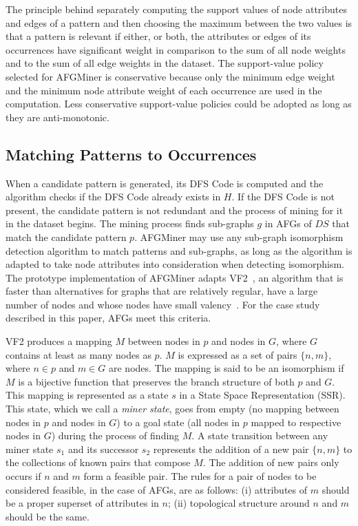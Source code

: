 The principle behind separately computing the support values of node attributes and edges of a pattern and then choosing the maximum between the two values is that a pattern is relevant if either, or both, the attributes or edges of its occurrences have significant weight in comparison to the sum of all node weights and to the sum of all edge weights in the dataset. The support-value policy selected for AFGMiner is conservative because only the minimum edge weight and the minimum node attribute weight of each occurrence are used in the computation. Less conservative support-value policies could be adopted as long as they are anti-monotonic.  

\subsection{Matching Patterns to Occurrences}
When a candidate pattern is generated, its DFS Code is computed and the algorithm checks if the DFS Code already exists in $H$. If the DFS Code is not present, the candidate pattern is not redundant and the process of mining for it in the dataset begins. The mining process finds sub-graphs $g$ in AFGs of $DS$ that match the candidate pattern $p$. AFGMiner may use any sub-graph isomorphism detection algorithm to match patterns and sub-graphs, as long as the algorithm is adapted to take node attributes into consideration when detecting isomorphism. The prototype implementation of AFGMiner adapts VF2~\cite{Cordella}, an algorithm that is faster than alternatives for graphs that are relatively regular, have a large number of nodes and whose nodes have small valency~\cite{Foggia}. For the case study described in this paper, AFGs meet this criteria. 

VF2 produces a mapping $M$ between nodes in $p$ and nodes in $G$, where $G$ contains at least as many nodes as $p$. $M$ is expressed as a set of pairs $\{n, m\}$, where $n \in p$ and $m \in G$ are nodes. The mapping is said to be an isomorphism if $M$ is a bijective function that preserves the branch structure of both $p$ and $G$. This mapping is represented as a state $s$ in a State Space Representation (SSR). This state, which we call a \emph{miner state}, goes from empty (no mapping between nodes in $p$ and nodes in $G$) to a goal state (all nodes in $p$ mapped to respective nodes in $G$) during the process of finding $M$. A state transition between any miner state $s_1$ and its successor $s_2$ represents the addition of a new pair $\{n, m\}$ to the collections of known pairs that compose $M$. The addition of new pairs only occurs if $n$ and $m$ form a feasible pair. The rules for a pair of nodes to be considered feasible, in the case of AFGs, are as follows: (i) attributes of $m$ should be a proper superset of attributes in $n$; (ii) topological structure around $n$ and $m$ should be the same.

